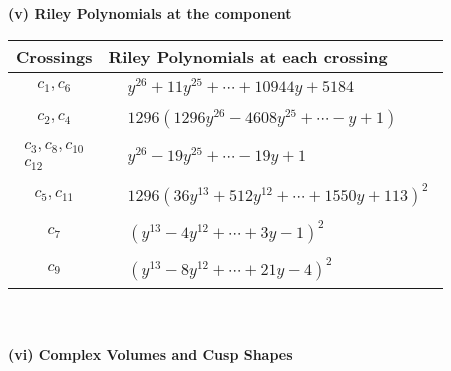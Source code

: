\documentclass[1p]{elsarticle_modified}
\theoremstyle{definition}
\begin{document}
\flushleft \textbf{(v) Riley Polynomials at the component}\newline \\
\begin{tabular}{m{50pt}|m{274pt}}
Crossings & \hspace{64pt}Riley Polynomials at each crossing \\
\hline $$\begin{aligned}c_{1},c_{6}\end{aligned}$$&$\begin{aligned}
&y^{26}+11 y^{25}+\cdots+10944 y+5184
\end{aligned}$\\
\hline $$\begin{aligned}c_{2},c_{4}\end{aligned}$$&$\begin{aligned}
&1296(1296 y^{26}-4608 y^{25}+\cdots- y+1)
\end{aligned}$\\
\hline $$\begin{aligned}c_{3},c_{8},c_{10}\\c_{12}\end{aligned}$$&$\begin{aligned}
&y^{26}-19 y^{25}+\cdots-19 y+1
\end{aligned}$\\
\hline $$\begin{aligned}c_{5},c_{11}\end{aligned}$$&$\begin{aligned}
&1296(36 y^{13}+512 y^{12}+\cdots+1550 y+113)^{2}
\end{aligned}$\\
\hline $$\begin{aligned}c_{7}\end{aligned}$$&$\begin{aligned}
&(y^{13}-4 y^{12}+\cdots+3 y-1)^{2}
\end{aligned}$\\
\hline $$\begin{aligned}c_{9}\end{aligned}$$&$\begin{aligned}
&(y^{13}-8 y^{12}+\cdots+21 y-4)^{2}
\end{aligned}$\\
\hline
\end{tabular}\\~\\
\newpage\flushleft \textbf{(vi) Complex Volumes and Cusp Shapes}
\end{document}
